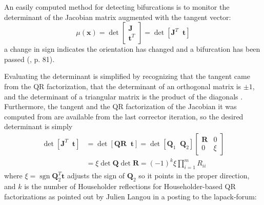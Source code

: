 \documentclass[10pt,openany,twoside]{book}
\numberwithin{equation}{section}   %
\newcommand{\Sgn}{\operatorname{sgn}}
\newcommand{\Matrix}[1]{\boldsymbol{#1}}
\newcommand{\Vector}[1]{\boldsymbol{#1}}
\begin{document}
An easily computed method for detecting bifurcations
is to monitor the determinant of the Jacobian matrix augmented with
the tangent vector:
\begin{equation*}
	\mu(\Vector{x}) = \det \left[ \begin{array}{c}
		\Matrix{J} \\
		\Vector{t}^T
	\end{array} \right] =
	\det \left[
		\Matrix{J}^T \;\; \Vector{t}
	\right]
\end{equation*}
a change in sign indicates the orientation has changed and a
bifurcation has been passed (\cite{allgower1990numerical}, p. 81).
\par
Evaluating the determinant is simplified by recognizing that the
tangent came from the QR factorization, that the determinant of an
orthogonal matrix is $\pm 1$, and the determinant of a triangular matrix
is the product of the diagonals \cite{meyer2015continuation}.
Furthermore, the tangent and the QR factorization of the Jacobian
it was computed from are available from the last corrector iteration,
so the desired determinant is simply
\begin{align*}
	\det \left[
		\Matrix{J}^T \;\; \Vector{t}
	\right] &=
	\det \left[
		\Matrix{QR} \;\; \Vector{t}
		\right] =
	\det \left[ \Matrix{Q}_1 \;\; \Matrix{Q}_2 \right]
		\left[ \begin{array}{cc}
			\Matrix{R} & 0 \\
			         0   & \xi
		\end{array} \right]  \nonumber \\
	&= \xi \det \Matrix{Q} \det \Matrix{R} =
		(-1)^k \xi \prod_{i=1}^m R_{ii}
\end{align*}
where $\xi = \Sgn{\Matrix{Q}_2^T\Vector{t}}$ adjusts the sign of $\Matrix{Q}_2$
so it points in the proper direction,
and $k$ is the number of Householder reflections for Householder-based
QR factorizations as pointed out by Julien Langou in a posting to
the lapack-forum:
\end{document}
